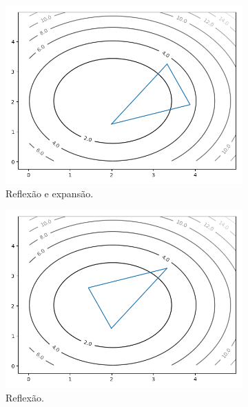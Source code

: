 \begin{figure}
\begin{subfigure}{.3\textwidth}
  \includegraphics[width=\linewidth]{figs/neldermeadexample/target-2.png}
  \caption{Reflexão e expansão.}
\end{subfigure}
\begin{subfigure}{.3\textwidth}
  \centering
  \includegraphics[width=\linewidth]{figs/neldermeadexample/target-3.png}
  \caption{Reflexão.}
\end{subfigure}%
\begin{subfigure}{.3\textwidth}
  \centering

\end{subfigure}
\end{figure}
